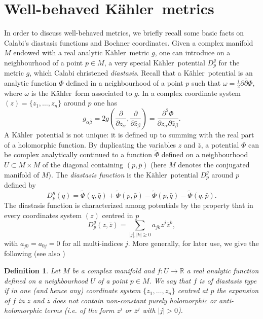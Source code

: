 \documentclass[12pt]{amsart}
\newcommand{\R}{\mathbb{R}}
\newcommand{\K}{K\"{a}hler}
\newtheorem{defin}{Definition}
\begin{document}
\section{Well-behaved \K\ metrics}\label{SecWellBehaved}
In order to discuss well-behaved metrics, we  briefly recall  some basic facts on Calabi's diastasis functions and Bochner coordinates.
Given a complex manifold $M$ endowed with a real analytic \K\ metric $g$, one can introduce on  a neighbourhood of a point $p\in M$, a very special \K\ potential $D^g_p$ for the metric $g$, which Calabi christened {\em diastasis}.
Recall that a \K\ potential is an analytic function $\Phi$ defined in a neighbourhood of a point $p$ such that $\omega =\frac{i}{2}\partial \bar\partial\Phi$, where $\omega$ is the \K\ form associated to $g$.
In a complex coordinate system $(z)=\{z_1, \dots ,z_n\}$ around $p$ one has
\begin{equation}\label{locg}
	g_{\alpha\bar\beta}=
	2g(\frac{\partial}{\partial z_{\alpha}},
	\frac{\partial}{\partial \bar z_{\beta}})
	=\frac{{\partial}^2\Phi}
	{\partial z_{\alpha}\partial\bar z_{\beta}}.
\end{equation}
A \K\ potential is not unique: it is defined up to summing with the real part of a holomorphic function.
By duplicating the variables $z$ and $\bar z$, a potential $\Phi$ can be complex analytically
continued to a function  $\tilde\Phi$ defined on a neighbourhood $U\subset M\times\overline M$ of the diagonal containing $(p, \bar p)$ (here $\overline M$ denotes the conjugated manifold of $M$).
The {\em diastasis function} is the \K\ potential $D^g_p$ around $p$ defined by
$$D^g_p(q)=\tilde\Phi (q, \bar q)+
\tilde\Phi (p, \bar p)-\tilde\Phi (p, \bar q)-
\tilde\Phi (q, \bar p).$$
The diastasis function is characterized among potentials by the property that in every coordinates system  $(z)$ centred in $p$
$$D^g_p(z, \bar z)=\sum _{|j|, |k|\geq 0}
a_{jk}z^j\bar z^k,$$
with  $a_{j 0}=a_{0 j}=0$ for all multi-indices $j$.
More generally, for later use, we give the following (see also \cite{LoiMossa21KRSIntoComplexSpaceForms,LoiMossa22HBD})
\begin{defin}\label{defdiast}\rm
	Let $M$ be a complex manifold and $f:U\rightarrow \R$ a real analytic function defined on a neighbourhood   $U$ of a point $p\in M$.
	We say  that $f$  is of  {\em diastasis type} if 
	in one (and hence any) coordinate system 
	$\{z_1, \dots , z_n\}$ centred at $p$ the   expansion of $f$  in $z$ and $\bar z$ 
	does not contain non-constant purely holomorphic or anti-holomorphic terms (i.e. of the form $z^{j}$ or $\bar{z}^{j}$ with  $\vert j\vert > 0$). 
\end{defin}
\end{document}
